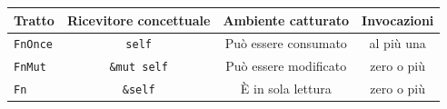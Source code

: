 \begin{table}[h!]
  \renewcommand{\arraystretch}{1.5}
  \centering
  \begin{tabular}{l c c c }
    \toprule
    \textbf{Tratto} & \textbf{Ricevitore concettuale} & \textbf{Ambiente catturato} & \textbf{Invocazioni} \\
    \midrule
    \texttt{FnOnce} & \texttt{self}                   & Può essere consumato        & al più una           \\
    \texttt{FnMut}  & \texttt{\&mut self}             & Può essere modificato       & zero o più           \\
    \texttt{Fn}     & \texttt{\&self}                 & È in sola lettura           & zero o più           \\
    \bottomrule
  \end{tabular}
\end{table}











